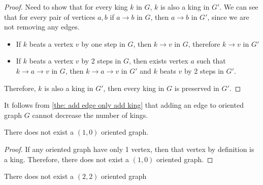 \begin{proof}
  Need to show that for every king \(k\) in \(G\),
  \(k\) is also a king in \(G'\).
  We can see that for every pair of vertices \(a, b\)
  if \(a \to b\) in \(G\), then \(a \to b\) in \(G'\),
  since we are not removing any edges.

  \begin{itemize}
    \item
      If \(k\) beats a vertex \(v\) by one step in \(G\),
      then \(k \to v\) in \(G\),
      therefore \(k \to v\) in \(G'\)
    \item
      If \(k\) beats a vertex \(v\) by 2 steps in \(G\),
      then exists vertex \(a\) such that
      \(k \to a \to v\) in \(G\), then \(k \to a \to v\) in \(G'\)
      and \(k\) beats \(v\) by 2 steps in \(G'\).
  \end{itemize}

  Therefore, \(k\) is also a king in \(G'\),
  then every king in \(G\) is preserved in \(G'\).
\end{proof}

It follows from \cref{the: add edge only add king}
that adding an edge to oriented graph \(G\)
cannot decrease the number of kings.

\begin{lemma}\label{the: no (1 0) oriented graph}
  There does not exist a \((1, 0)\) oriented graph.
\end{lemma}
\begin{proof}
  If any oriented graph have only 1 vertex,
  then that vertex by definition is a king.
  Therefore, there does not exist a \((1, 0)\) oriented graph.
\end{proof}

\begin{lemma}\label{the: no (2 2) oriented graph}
  There does not exist a \((2, 2)\) oriented graph
\end{lemma}

